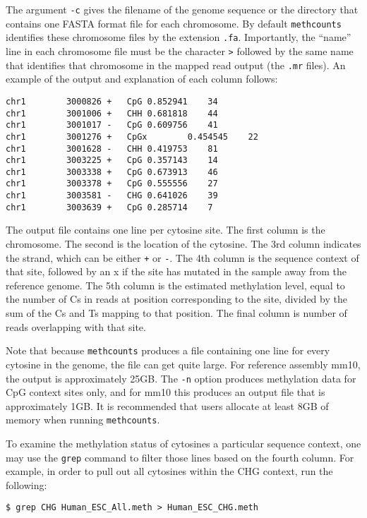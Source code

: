 \documentclass[10pt]{article}
\newcommand{\prog}[1]{\texttt{#1}}
\newcommand{\fn}[1]{\texttt{#1}}
\newcommand{\lit}[1]{\texttt{#1}}
\newcommand{\op}[1]{\texttt{#1}}
\begin{document}
The argument \op{-c} gives the filename of the genome sequence or the
directory that contains one FASTA format file for each chromosome. By
default \prog{methcounts} identifies these chromosome files by the
extension \fn{.fa}. Importantly, the ``name'' line in each chromosome
file must be the character \lit{>} followed by the same name that
identifies that chromosome in the mapped read output (the \fn{.mr}
files). An example of the output and explanation of each column follows:

{\small{%
\begin{verbatim}
chr1		3000826	+	CpG	0.852941	34
chr1		3001006	+	CHH	0.681818	44
chr1		3001017	-	CpG	0.609756	41
chr1		3001276	+	CpGx		0.454545	22
chr1		3001628	-	CHH	0.419753	81
chr1		3003225	+	CpG	0.357143	14
chr1		3003338	+	CpG	0.673913	46
chr1		3003378	+	CpG	0.555556	27
chr1		3003581	-	CHG	0.641026	39
chr1		3003639	+	CpG	0.285714	7
\end{verbatim}%
}}

The output file contains one line per cytosine site. The first column is
the chromosome. The second is the location of the cytosine. The 3rd column
indicates the strand, which can be either \lit{+} or \lit{-}. The 4th
column is the sequence context of that site, followed by an x if the
site has mutated in the sample away from the reference genome. The 5th 
column is the estimated methylation level, equal to the number of Cs in 
reads at position corresponding to the site, divided by the sum of the Cs 
and Ts mapping to that position. The final column is number of reads
overlapping with that site.

Note that because \prog{methcounts} produces a file containing one line
for every cytosine in the genome, the file can get quite large. For
reference assembly mm10, the output is approximately 25GB. The \op{-n}
option produces methylation data for CpG context sites only, and for
mm10 this produces an output file that is approximately 1GB. It is
recommended that users allocate at least 8GB of memory when running
\prog{methcounts}.

To examine the methylation status of cytosines a particular sequence
context, one may use the \prog{grep} command to filter those lines
based on the fourth column. For example, in order to pull out all
cytosines within the CHG context, run the following:

\begin{verbatim}
$ grep CHG Human_ESC_All.meth > Human_ESC_CHG.meth
\end{verbatim}
\end{document}

